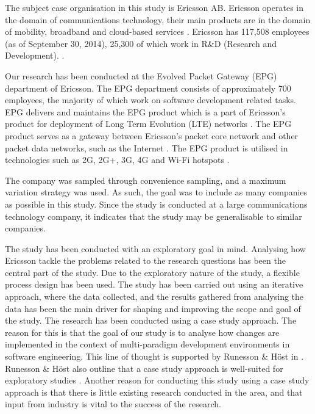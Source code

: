 \documentclass[10pt,twocolumn]{article}
\begin{document}

The subject case organisation in this study is Ericsson AB. Ericsson operates in the domain of communications technology, their main products are in the domain of mobility, broadband and cloud-based services \cite{a7} \cite{a8}. Ericsson has 117,508 employees (as of September 30, 2014), 25,300 of which work in R\&D (Research and Development). \cite{a7}. 

Our research has been conducted at the Evolved Packet Gateway (EPG) department of Ericsson. The EPG department consists of approximately 700 employees, the majority of which work on software development related tasks. EPG delivers and maintains the EPG product which is a part of Ericsson's product for deployment of Long Term Evolution (LTE) networks \cite{a9}. The EPG product serves as a gateway between Ericsson's packet core network and other packet data networks, such as the Internet \cite{a9}. The EPG product is utilised in technologies such as 2G, 2G+, 3G, 4G and Wi-Fi hotspots \cite{a9}. 

The company was sampled through convenience sampling, and a maximum variation strategy was used. As such, the goal was to include as many companies as possible in this study. Since the study is conducted at a large communications technology company, it indicates that the study may be generalisable to similar companies. 

The study has been conducted with an exploratory goal in mind. Analysing how Ericsson tackle the problems related to the research questions has been the central part of the study. Due to the exploratory nature of the study, a flexible process design has been used. The study has been carried out using an iterative approach, where the data collected, and the results gathered from analysing the data has been the main driver for shaping and improving the scope and goal of the study. The research has been conducted using a case study approach. The reason for this is that the goal of our study is to analyse how changes are implemented in the context of multi-paradigm development environments in software engineering. This line of thought is supported by Runesson \& Höst in \cite{runeson2009guidelines}. Runesson \& Höst also outline that a case study approach is well-suited for exploratory studies \cite{runeson2009guidelines}. Another reason for conducting this study using a case study approach is that there is little existing research conducted in the area, and that input from industry is vital to the success of the research. 
\end{document}
